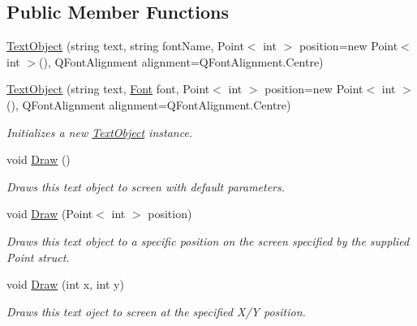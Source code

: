 \subsection*{Public Member Functions}
\begin{DoxyCompactItemize}
\item 
\hyperlink{class_tri_devs_1_1_tri_engine2_d_1_1_text_1_1_text_object_ac5802fb2f68a2b4149767b3c143dfed4}{Text\-Object} (string text, string font\-Name, Point$<$ int $>$ position=new Point$<$ int $>$(), Q\-Font\-Alignment alignment=Q\-Font\-Alignment.\-Centre)
\item 
\hyperlink{class_tri_devs_1_1_tri_engine2_d_1_1_text_1_1_text_object_a4c2762cb2314aaff1c7f01bd1c93cff1}{Text\-Object} (string text, \hyperlink{class_tri_devs_1_1_tri_engine2_d_1_1_text_1_1_font}{Font} font, Point$<$ int $>$ position=new Point$<$ int $>$(), Q\-Font\-Alignment alignment=Q\-Font\-Alignment.\-Centre)
\begin{DoxyCompactList}\small\item\em Initializes a new \hyperlink{class_tri_devs_1_1_tri_engine2_d_1_1_text_1_1_text_object}{Text\-Object} instance. \end{DoxyCompactList}\item 
void \hyperlink{class_tri_devs_1_1_tri_engine2_d_1_1_text_1_1_text_object_aa1dac84508d96d14b330d9cc8b084257}{Draw} ()
\begin{DoxyCompactList}\small\item\em Draws this text object to screen with default parameters. \end{DoxyCompactList}\item 
void \hyperlink{class_tri_devs_1_1_tri_engine2_d_1_1_text_1_1_text_object_a71a5fac838974d75dae4e35d0a492d32}{Draw} (Point$<$ int $>$ position)
\begin{DoxyCompactList}\small\item\em Draws this text object to a specific position on the screen specified by the supplied Point struct. \end{DoxyCompactList}\item 
void \hyperlink{class_tri_devs_1_1_tri_engine2_d_1_1_text_1_1_text_object_a7f80fe0e691d20141e24b9bc98dc8a25}{Draw} (int x, int y)
\begin{DoxyCompactList}\small\item\em Draws this text oject to screen at the specified X/\-Y position. \end{DoxyCompactList}\end{DoxyCompactItemize}
